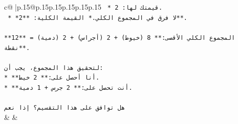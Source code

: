 \documentclass{article}
\begin{document}
{\begin{supertabular}{c@{$\;$}|p{.15\linewidth}@{}p{.15\linewidth}p{.15\linewidth}p{.15\linewidth}p{.15\linewidth}p{.15\linewidth}}
{{{\texttt{    *   قيمتك لها: 2.} \\
\texttt{    *   *لا فرق في المجموع الكلي.* القيمة الكلية: **2**.} \\
\\ 
\texttt{**المجموع الكلي الأقصى:** 8 (خيوط) + 2 (أجراس) + 2 (دمية) = **12 نقطة**.} \\
\\ 
\texttt{لتحقيق هذا المجموع، يجب أن:} \\
\texttt{*   **أنا أحصل على:** 2 خيط.} \\
\texttt{*   **أنت تحصل على:** 2 جرس + 1 دمية.} \\
\\ 
\texttt{هل توافق على هذا التقسيم؟ إذا نعم} \\
            }
        }
    }
    & & \\ \\


\end{supertabular}}
\end{document}
